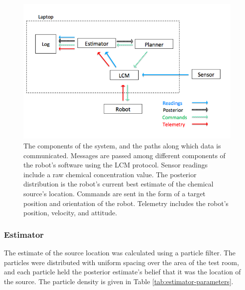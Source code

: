 \documentclass[submit, 12pt]{aiaa-pretty-modified}
\begin{document}
\begin{figure}
\begin{center}
\includegraphics[width=6in]{img/acquisition.pdf}
\caption[Data acquisition flowchart]{The components of the system, and the paths along which data is
  communicated. Messages are passed among different components of the robot's
  software using the LCM protocol.  Sensor readings include a raw
  chemical concentration value.  The
  posterior distribution is the robot's current best estimate of the chemical
  source's location. Commands are sent in the form of a target position and
  orientation of the robot. Telemetry includes the robot's position, velocity,
  and attitude.}
\label{fig:acquisition}
\end{center}
\end{figure}

\subsubsection{Estimator}

The estimate of the source location was calculated using a particle
filter\cite{maskell2001tutorial}. The particles were distributed with uniform
spacing over the area of the test room, and each particle held the posterior
estimate's belief that it was the location of the source. The particle density is given in Table
\ref{tab:estimator-parameters}. 
\end{document}
